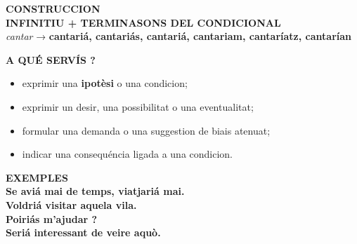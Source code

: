 \documentclass[a4paper,11pt]{article}
\begin{document}
\vspace{2.5mm}\hspace*{6mm}\begin{minipage}{.91\textwidth}
\begin{violetbox}\textbf{\color{VioletDark}CONSTRUCCION}\\[1mm]\centering
{\Large\textbf{INFINITIU + TERMINASONS DEL CONDICIONAL}}\\[1mm]
\small \textit{cantar} → \textbf{cantariá, cantariás, cantariá, cantariam, cantaríatz, cantarían}
\end{violetbox}
\vspace{2.5mm}\begin{center}\end{center}
\vspace{1.5mm}\begin{violetbox}\textbf{\color{VioletDark}A QUÉ SERVÍS ?}\\[1mm]
\begin{itemize}\setlength{\itemsep}{.4mm}
\item exprimir una \textbf{ipotèsi} o una condicion;
\item exprimir un desir, una possibilitat o una eventualitat;
\item formular una demanda o una suggestion de biais atenuat;
\item indicar una consequéncia ligada a una condicion.
\end{itemize}\end{violetbox}
\vspace{2mm}\begin{violetbox}\textbf{\color{VioletDark}EXEMPLES}\\[1mm]
\textbf{Se aviá mai de temps, viatjariá mai.}\\
\textbf{Voldriá visitar aquela vila.}\\
\textbf{Poiriás m'ajudar ?}\\
\textbf{Seriá interessant de veire aquò.}
\end{violetbox}

\end{minipage}
\end{document}
